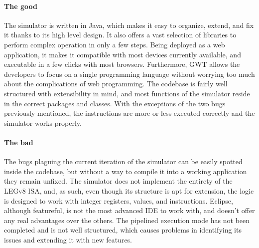 \paragraph{The good}
The simulator is written in Java, which makes it easy to organize, extend, and fix it thanks to its high level design. It also offers a vast selection of libraries to perform complex operation in only a few steps. Being deployed as a web application, it makes it compatible with most devices currently available, and executable in a few clicks with most browsers. Furthermore, GWT allows the developers to focus on a single programming language without worrying too much about the complications of web programming. The codebase is fairly well structured with extensibility in mind, and most functions of the simulator reside in the correct packages and classes. With the exceptions of the two bugs previously mentioned, the instructions are more or less executed correctly and the simulator works properly.
\paragraph{The bad}
The bugs plaguing the current iteration of the simulator can be easily spotted inside the codebase, but without a way to compile it into a working application they remain unfixed. The simulator does not implement the entirety of the LEGv8 ISA, and, as such, even though its structure is apt for extension, the logic is designed to work with integer registers, values, and instructions. Eclipse, although featureful, is not the most advanced IDE to work with, and doesn't offer any real advantages over the others. The pipelined execution mode has not been completed and is not well structured, which causes problems in identifying its issues and extending it with new features. 

